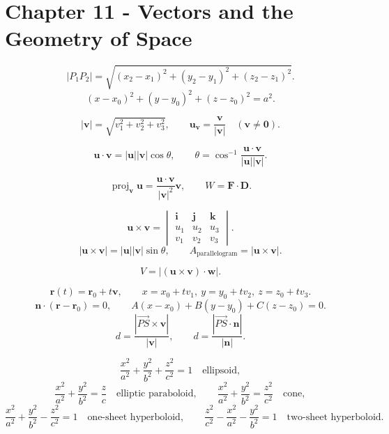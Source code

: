 
\section*{Chapter 11 - Vectors and the Geometry of Space}

\[
  |P_1P_2|=\sqrt{(x_2-x_1)^2+(y_2-y_1)^2+(z_2-z_1)^2}.
\]
\[
  (x-x_0)^2+(y-y_0)^2+(z-z_0)^2=a^2.
\]

\[
  |\mathbf v|=\sqrt{v_1^2+v_2^2+v_3^2},
  \qquad
  \mathbf u_{\mathbf v}=\frac{\mathbf v}{|\mathbf v|}
  \quad(\mathbf v\ne\mathbf0).
\]

\[
  \mathbf u\cdot\mathbf v
  =
  |\mathbf u||\mathbf v|\cos\theta,
  \qquad
  \theta=\cos^{-1}\frac{\mathbf u\cdot\mathbf v}{|\mathbf u||\mathbf v|}.
\]

\[
  \operatorname{proj}_{\mathbf v}\mathbf u
  =
  \frac{\mathbf u\cdot\mathbf v}{|\mathbf v|^2}\mathbf v,
  \qquad
  W=\mathbf F\cdot\mathbf D.
\]

\[
  \mathbf u\times\mathbf v
  =
  \begin{vmatrix}
    \mathbf i&\mathbf j&\mathbf k\\
    u_1&u_2&u_3\\
    v_1&v_2&v_3
  \end{vmatrix}.
\]
\[
  |\mathbf u\times\mathbf v|
  =
  |\mathbf u||\mathbf v|\sin\theta,
  \qquad
  A_{\text{parallelogram}}=|\mathbf u\times\mathbf v|.
\]

\[
  V=|(\mathbf u\times\mathbf v)\cdot\mathbf w|.
\]

\[
  \mathbf r(t)=\mathbf r_0+t\mathbf v,
  \qquad
  x=x_0+tv_1,\ y=y_0+tv_2,\ z=z_0+tv_3.
\]
\[
  \mathbf n\cdot(\mathbf r-\mathbf r_0)=0,
  \qquad
  A(x-x_0)+B(y-y_0)+C(z-z_0)=0.
\]
\[
  d=\frac{|\overrightarrow{PS}\times\mathbf v|}{|\mathbf v|},
  \qquad
  d=\frac{|\overrightarrow{PS}\cdot\mathbf n|}{|\mathbf n|}.
\]

\[
  \frac{x^2}{a^2}+\frac{y^2}{b^2}+\frac{z^2}{c^2}=1
  \quad\text{ellipsoid},
\]
\[
  \frac{x^2}{a^2}+\frac{y^2}{b^2}=\frac{z}{c}
  \quad\text{elliptic paraboloid},
  \qquad
  \frac{x^2}{a^2}+\frac{y^2}{b^2}=\frac{z^2}{c^2}
  \quad\text{cone},
\]
\[
  \frac{x^2}{a^2}+\frac{y^2}{b^2}-\frac{z^2}{c^2}=1
  \quad\text{one-sheet hyperboloid},
  \qquad
  \frac{z^2}{c^2}-\frac{x^2}{a^2}-\frac{y^2}{b^2}=1
  \quad\text{two-sheet hyperboloid}.
\]

